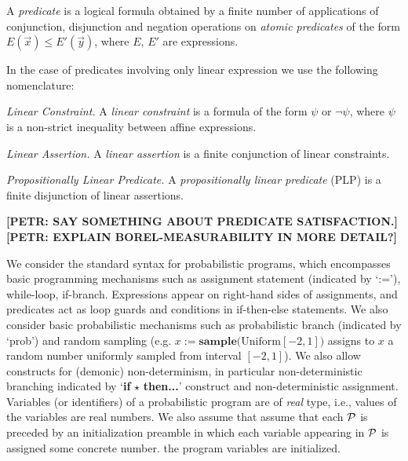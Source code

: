 \smallskip{}
A \emph{predicate} is a logical formula obtained by a finite number of applications of conjunction, disjunction and negation operations on \emph{atomic predicates} of the form $E(\vec{x})\leq E'(\vec{y})$, where $E$, $E'$ are expressions.

\smallskip{}
In the case of predicates involving only linear expression we use the following nomenclature:
\begin{compactitem}
	\item {\em Linear Constraint.} A \emph{linear constraint} is a formula of the
	form $\psi$ or $\neg\psi$, where  $\psi$ is a non-strict inequality
	between affine expressions.
	\item {\em Linear Assertion.} A \emph{linear assertion} is a finite conjunction
	of linear constraints.
	\item {\em Propositionally Linear Predicate.}
	A  \emph{propositionally linear predicate} (PLP) is a finite disjunction of
	linear assertions.
\end{compactitem}

\textbf{[PETR: SAY SOMETHING ABOUT PREDICATE SATISFACTION.]}
\textbf{[PETR: EXPLAIN BOREL-MEASURABILITY IN MORE DETAIL?]}


We consider the standard syntax for probabilistic programs,
which encompasses basic programming mechanisms such as assignment statement 
(indicated by `:='), while-loop, if-branch. Expressions appear on right-hand sides of assignments, and predicates act as loop guards and conditions in if-then-else statements. We also consider basic probabilistic mechanisms 
such as probabilistic branch (indicated by `prob') and random sampling (e.g. 
$x:=\textbf{sample(}\mathrm{Uniform}[-2,1]\textbf{)}$ assigns to $x$ a random 
number 
uniformly sampled from interval $[-2,1]$). We also allow constructs for 
(demonic) non-determinism, in particular 
non-deterministic branching indicated by `\textbf{if }$\star$ \textbf{then...}' construct and non-deterministic assignment.  
Variables (or identifiers) of a probabilistic program are of \emph{real} type, i.e., 
values of the variables are real numbers. 
We also assume that assume that each \PP{} $\mathcal{P}$ is preceded by an 
initialization preamble 
in 
which 
each variable appearing in $\mathcal{P}$ is assigned some concrete number.
the program variables are initialized. 

